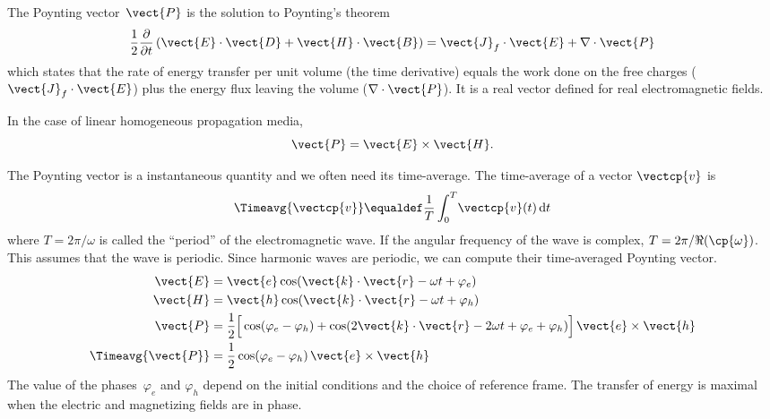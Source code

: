 \begin{refsection}
The Poynting vector~$\vect{P}$ is the solution to Poynting's theorem
\begin{equation}
    \frac{1}{2}\frac{\partial}{\partial t}
    \left(
        \vect{E} \cdot \vect{D} + \vect{H} \cdot \vect{B}
    \right)
    =
    \vect{J}_f \cdot \vect{E}
    +
    \nabla \cdot \vect{P}
    \label{eq:poynting_theorem}
\end{equation}
which states that the rate of energy transfer per unit volume (the time derivative)
equals the work done on the free charges ($\vect{J}_f \cdot \vect{E}$)
plus the energy flux leaving the volume ($\nabla \cdot \vect{P}$).
It is a real vector defined for real electromagnetic fields.

In the case of linear homogeneous propagation media,
\begin{equation}
    \vect{P} = \vect{E} \times \vect{H}
    \text{.}
    \label{eq:poynting_vector}
\end{equation}

The Poynting vector is a instantaneous quantity and we often need its time-average.
The time-average of a vector $\vectcp{v}$ is
\begin{equation}
    \Timeavg{\vectcp{v}}
    \equaldef
    \frac{1}{T}
    \int_0^T \! \vectcp{v}(t)\, \mathrm{d}t
    \label{eq:def_time_average}
\end{equation}
where $T=2\pi/\omega$ is called the ``period'' of the electromagnetic wave.
If the angular frequency of the wave is complex, $T=2\pi/\Re(\cp{\omega})$.
This assumes that the wave is periodic.
Since harmonic waves are periodic, we can compute their time-averaged Poynting vector.
\begin{align}
    \vect{E} &= \vect{e} \cos(\vect{k}\cdot\vect{r} - \omega t + \varphi_e)
    \\
    \vect{H} &= \vect{h} \cos(\vect{k}\cdot\vect{r} - \omega t + \varphi_h)
    \\
    \vect{P} &=
    \frac{1}{2}
    \Big[
        \cos(\varphi_e - \varphi_h)
        +
        \cos(2\vect{k}\cdot\vect{r} - 2\omega t + \varphi_e + \varphi_h)
    \Big]
    \,
    \vect{e} \times \vect{h}
    \\
    \Timeavg{\vect{P}}
    &=
    \frac{1}{2} \cos(\varphi_e - \varphi_h) \, \vect{e} \times \vect{h}
\end{align}
The value of the phases~$\varphi_e$ and $\varphi_h$ depend on the initial conditions and the choice of reference frame.
The transfer of energy is maximal when the electric and magnetizing fields are in phase.


\end{refsection}
